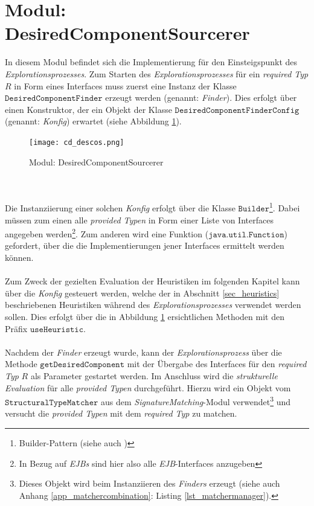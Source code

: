 \section{Modul: DesiredComponentSourcerer}\label{sec_impl_descos}
In diesem \Gls{Modul} befindet sich die Implementierung für den Einsteigspunkt des \emph{Explorationsprozesses}. Zum Starten des \emph{Explorationsprozesses} für ein \emph{required Typ} $R$ in Form eines \Gls{Interface}s muss zuerst eine Instanz der Klasse $\texttt{DesiredComponentFinder}$ erzeugt werden (genannt: \emph{Finder}). Dies erfolgt über einen Konstruktor, der ein Objekt der Klasse $\texttt{DesiredComponentFinderConfig}$ (genannt: \emph{Konfig}) erwartet (siehe Abbildung \ref{cd_descos}). 
\begin{figure}[h!]
\centering
\texttt{[image: cd\_descos.png]}
\caption{Modul: DesiredComponentSourcerer}
\label{cd_descos}
\end{figure}
\noindent
\\\\
Die Instanziierung einer solchen \emph{Konfig} erfolgt über die Klasse $\texttt{Builder}$\footnote{Builder-Pattern (siehe auch \cite{patterns})}. Dabei müssen zum einen alle  \emph{provided Typen} in Form einer Liste von \Gls{Interface}s angegeben werden\footnote{In Bezug auf \emph{EJBs} sind hier also alle \emph{EJB}-\Gls{Interface}s anzugeben}. Zum anderen wird eine Funktion ($\texttt{java.util.Function}$) gefordert, über die die Implementierungen jener \Gls{Interface}s ermittelt werden können.
\\\\
Zum Zweck der gezielten Evaluation der Heuristiken im folgenden Kapitel kann über die \emph{Konfig} gesteuert werden, welche der in Abschnitt \ref{sec_heuristics} beschriebenen Heuristiken während des \emph{Explorationsprozesses} verwendet werden sollen. Dies erfolgt über die in Abbildung \ref{cd_descos} ersichtlichen Methoden mit den Präfix $\texttt{useHeuristic}$.
\\\\
Nachdem der \emph{Finder} erzeugt wurde, kann der \emph{Explorationsprozess} über die Methode $\texttt{getDesiredComponent}$ mit der Übergabe des \Gls{Interface}s für den \emph{required Typ} $R$ als Parameter gestartet werden. Im Anschluss wird die \emph{strukturelle Evaluation} für alle \emph{provided Typen}  durchgeführt. Hierzu wird ein Objekt vom $\texttt{StructuralTypeMatcher}$ aus dem \emph{SignatureMatching}-\Gls{Modul} verwendet\footnote{Dieses Objekt wird beim Instanziieren des \emph{Finders} erzeugt (siehe auch Anhang \ref{app_matchercombination}: Listing \ref{lst_matchermanager}).} und versucht die \emph{provided Typen} mit dem \emph{required Typ} zu matchen.
